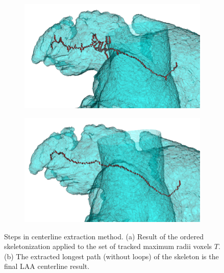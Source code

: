 \documentclass[review]{elsarticle}
\begin{document}
\begin{figure}[t]
  \centering
  \begin{subfigure}[b]{.45\linewidth}
    \centering
    \includegraphics[width=\textwidth]{fig4a.png}
    \caption{}
    \label{fig:centerline_skeleton}  
  \end{subfigure}%
  \hspace{1em}
  \begin{subfigure}[b]{.45\linewidth}
    \centering
    \includegraphics[width=\textwidth]{fig4b.png}
    \caption{}
    \label{fig:centerline_longest_path}  
  \end{subfigure}
  \caption{Steps in centerline extraction method. 
    (a) Result of the ordered skeletonization applied to 
    the set of tracked maximum radii voxels $T$. (b) The extracted longest path 
    (without loops) of the skeleton is the final LAA centerline result.}
  \label{fig:widening}
\end{figure}
\end{document}
